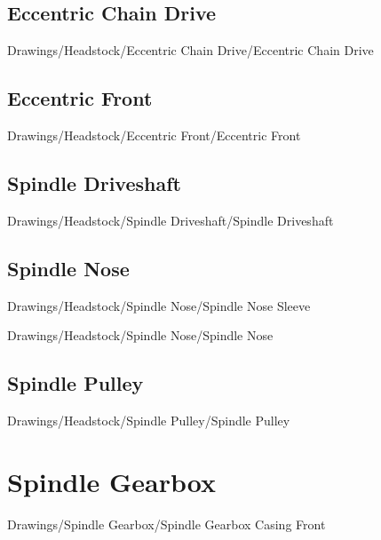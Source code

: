 \subsection{Eccentric Chain Drive}


{Drawings/Headstock/Eccentric Chain Drive/Eccentric Chain Drive}

\subsection{Eccentric Front}


{Drawings/Headstock/Eccentric Front/Eccentric Front}

\subsection{Spindle Driveshaft}


{Drawings/Headstock/Spindle Driveshaft/Spindle Driveshaft}

\subsection{Spindle Nose}


{Drawings/Headstock/Spindle Nose/Spindle Nose Sleeve}


{Drawings/Headstock/Spindle Nose/Spindle Nose}

\subsection{Spindle Pulley}


{Drawings/Headstock/Spindle Pulley/Spindle Pulley}

\section{Spindle Gearbox}


{Drawings/Spindle Gearbox/Spindle Gearbox Casing Front}

